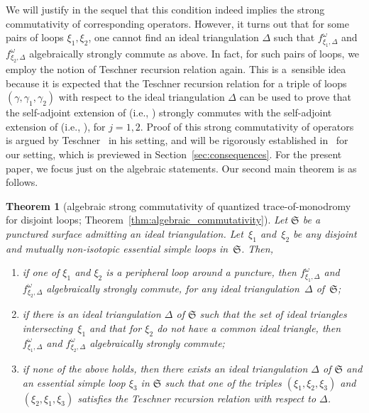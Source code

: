 \documentclass[pdftex]{sigma}
\numberwithin{equation}{section}
\newtheorem{Theorem}{Theorem}[section]
\theoremstyle{definition}
\begin{document}
We will justify in the sequel \cite{sequel} that this condition indeed implies the strong commutativity of corresponding operators. However, it turns out that for some pairs of loops $\xi_1,\xi_2$, one cannot find an ideal triangulation $\Delta$ such that $f^\omega_{\xi_1,\Delta}$ and $f^\omega_{\xi_2,\Delta}$ algebraically strongly commute as above. In fact, for such pairs of loops, we employ the notion of Teschner recursion relation again. This is a~sensible idea because it is expected that the Teschner recursion relation for a triple of loops $(\gamma,\gamma_1,\gamma_2)$ with respect to the ideal triangulation $\Delta$ can be used to prove that the self-adjoint extension of  \big(i.e., \big) strongly commutes with the self-adjoint extension of  \big(i.e., \big), for $j=1,2$. Proof of this strong commutativity of operators is argued by Teschner~\cite{T} in his setting, and will be rigorously established in~\cite{sequel} for our setting, which is previewed in Section~\ref{sec:consequences}. For the present paper, we focus just on the algebraic statements. Our second main theorem is as follows.
\begin{Theorem}[algebraic strong commutativity of quantized trace-of-monodromy for disjoint loops; Theorem~\ref{thm:algebraic_commutativity}]
\label{thm:intro_second_main}
Let $\mathfrak{S}$ be a punctured surface admitting an ideal triangulation. Let~$\xi_1$ and~$\xi_2$ be any disjoint and mutually non-isotopic essential simple loops in~$\mathfrak{S}$. Then,
\begin{enumerate}[label={\rm (\arabic*)}]\itemsep=0pt
\item if one of $\xi_1$ and $\xi_2$ is a peripheral loop around a puncture, then $f^\omega_{\xi_1,\Delta}$ and $f^\omega_{\xi_2,\Delta}$ algebraically strongly commute, for any ideal triangulation~$\Delta$ of~$\mathfrak{S}$;
\item if there is an ideal triangulation $\Delta$ of $\mathfrak{S}$ such that the set of ideal triangles intersecting~$\xi_1$ and that for $\xi_2$ do not have a common ideal triangle, then $f^\omega_{\xi_1,\Delta}$ and $f^\omega_{\xi_2,\Delta}$ algebraically strongly commute;
\item if none of the above holds, then there exists an ideal triangulation $\Delta$ of $\mathfrak{S}$ and an essential simple loop $\xi_3$ in $\mathfrak{S}$ such that one of the triples $(\xi_1,\xi_2,\xi_3)$ and $(\xi_2,\xi_1,\xi_3)$ satisfies the Teschner recursion relation with respect to $\Delta$.
\end{enumerate}
\end{Theorem}
\end{document}
